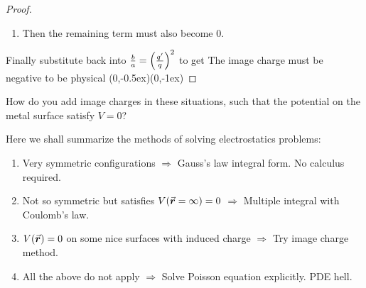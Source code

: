 \documentclass[class=article, crop=false, 12pt]{standalone}
\begin{document}
\begin{example}
\begin{proof}
\begin{enumerate}
            \item Then the remaining term must also become $0$. 
        \end{enumerate}
        
        Finally substitute back into $\frac{b}{a} = \qty(\frac{q'}{q})^2$ to get 
        {\scriptsize The image charge must be\\[-1ex]\scriptsize negative to be physical}
        {(0,-0.5ex)}{(0,-1ex)}


    \end{proof}
\end{example}




\begin{exercise}
    How do you add image charges in these situations,
    such that the potential on the metal surface satisfy $V=0$?


\end{exercise}


\linesep
Here we shall summarize the methods of solving electrostatics problems:
\begin{enumerate}
    \item Very symmetric configurations 
    $\Rightarrow$ Gauss's law integral form. No calculus required.

    \item Not so symmetric but satisfies $V(\va*{r}=\infty)=0$ 
    $\Rightarrow$ Multiple integral with Coulomb's law.

    \item $V(\va*{r})=0$ on some nice surfaces with induced charge
    $\Rightarrow$ Try image charge method.

    \item All the above do not apply 
    $\Rightarrow$ Solve Poisson equation explicitly. PDE hell. %
\end{enumerate}

\theend
\end{document}
